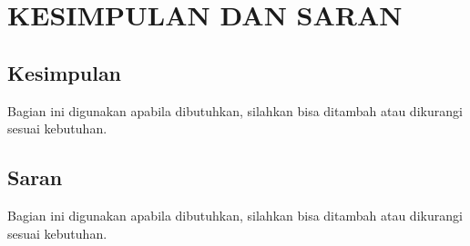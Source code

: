 
\chapter[KESIMPULAN DAN SARAN]{\\ KESIMPULAN DAN SARAN}

\section{Kesimpulan}
Bagian ini digunakan apabila dibutuhkan, silahkan bisa ditambah atau dikurangi sesuai kebutuhan.

\section{Saran}
Bagian ini digunakan apabila dibutuhkan, silahkan bisa ditambah atau dikurangi sesuai kebutuhan.